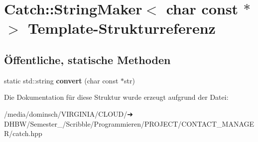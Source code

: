 \hypertarget{structCatch_1_1StringMaker_3_01char_01const_01_5_01_4}{}\section{Catch\+:\+:String\+Maker$<$ char const $\ast$ $>$ Template-\/\+Strukturreferenz}
\label{structCatch_1_1StringMaker_3_01char_01const_01_5_01_4}
\subsection*{Öffentliche, statische Methoden}
\begin{DoxyCompactItemize}
\item 
\mbox{\label{structCatch_1_1StringMaker_3_01char_01const_01_5_01_4_a20813965ad59cdf6d1f874f47158432d}} 
static std\+::string {\bfseries convert} (char const $\ast$str)
\end{DoxyCompactItemize}


Die Dokumentation für diese Struktur wurde erzeugt aufgrund der Datei\+:\begin{DoxyCompactItemize}
\item 
/media/dominsch/\+V\+I\+R\+G\+I\+N\+I\+A/\+C\+L\+O\+U\+D/➔ D\+H\+B\+W/\+Semester\+\_/\+Scribble/\+Programmieren/\+P\+R\+O\+J\+E\+C\+T/\+C\+O\+N\+T\+A\+C\+T\+\_\+\+M\+A\+N\+A\+G\+E\+R/catch.\+hpp\end{DoxyCompactItemize}
